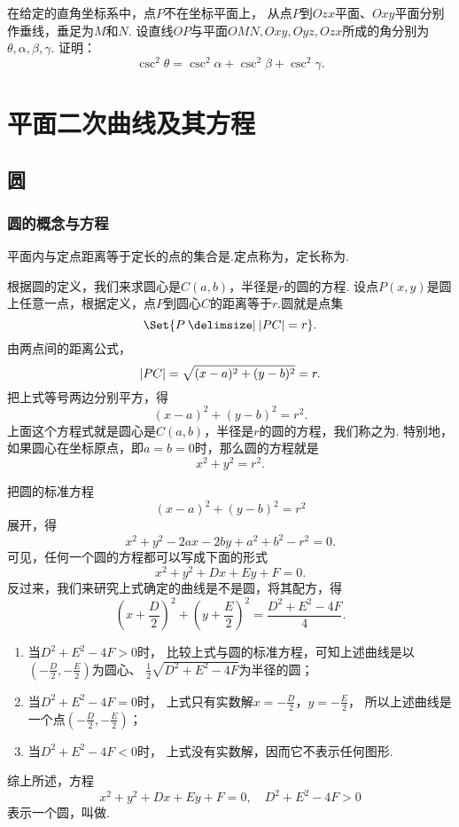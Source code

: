 \begin{example}
在给定的直角坐标系中，点\(P\)不在坐标平面上，
从点\(P\)到\(Ozx\)平面、\(Oxy\)平面分别作垂线，垂足为\(M\)和\(N\).
设直线\(OP\)与平面\(OMN,Oxy,Oyz,Ozx\)所成的角分别为\(\theta,\alpha,\beta,\gamma\).
证明：\[
	\csc^2\theta = \csc^2\alpha+\csc^2\beta+\csc^2\gamma.
\]
\end{example}

\section{平面二次曲线及其方程}
\subsection{圆}
\subsubsection{圆的概念与方程}
\begin{definition}
平面内与定点距离等于定长的点的集合是.定点称为，定长称为.
\end{definition}

根据圆的定义，我们来求圆心是\(C(a,b)\)，半径是\(r\)的圆的方程.
设点\(P(x,y)\)是圆上任意一点，根据定义，点\(P\)到圆心\(C\)的距离等于\(r\).圆就是点集\[
\Set{ P \given \abs{PC} = r }.
\]由两点间的距离公式，\[
\abs{PC} = \sqrt{(x-a)^2+(y-b)^2} = r.
\]把上式等号两边分别平方，得\begin{equation}
(x-a)^2+(y-b)^2 = r^2.
\end{equation}上面这个方程式就是圆心是\(C(a,b)\)，半径是\(r\)的圆的方程，我们称之为.
特别地，如果圆心在坐标原点，即\(a=b=0\)时，那么圆的方程就是\begin{equation}
x^2+y^2 = r^2.
\end{equation}

把圆的标准方程\[
(x-a)^2+(y-b)^2 = r^2
\]
展开，得\[
x^2 + y^2 - 2ax - 2by + a^2 + b^2 - r^2 = 0.
\]
可见，任何一个圆的方程都可以写成下面的形式\[
x^2 + y^2 + Dx + Ey + F = 0.
\]
反过来，我们来研究上式确定的曲线是不是圆，将其配方，得\[
\left(x+\frac{D}{2}\right)^2+\left(y+\frac{E}{2}\right)^2 = \frac{D^2+E^2-4F}{4}.
\]\begin{enumerate}
	\item 当\(D^2+E^2-4F > 0\)时，
	比较上式与圆的标准方程，可知上述曲线是以\((-\frac{D}{2},-\frac{E}{2})\)为圆心、
	\(\frac{1}{2} \sqrt{D^2+E^2-4F}\)为半径的圆；

	\item 当\(D^2+E^2-4F = 0\)时，
	上式只有实数解\(x=-\frac{D}{2}\)，\(y=-\frac{E}{2}\)，
	所以上述曲线是一个点\((-\frac{D}{2},-\frac{E}{2})\)；

	\item 当\(D^2+E^2-4F < 0\)时，
	上式没有实数解，因而它不表示任何图形.
\end{enumerate}
综上所述，方程\begin{equation}
	x^2 + y^2 + Dx + Ey + F = 0,
	\quad
	D^2+E^2-4F > 0
\end{equation}
表示一个圆，叫做.

